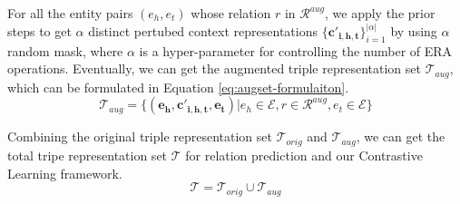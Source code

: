 \documentclass[11pt]{article}
\begin{document}
    For all the entity pairs $(e_h,e_t)$ whose relation $r$ in $\mathcal{R}^{aug}$, we apply the prior steps to get $\alpha$ distinct pertubed context representations $\{\mathbf{c'_{i,h,t}}\}^{|\alpha|}_{i=1}$ by using $\alpha$ random mask, where $\alpha$ is a hyper-parameter for controlling the number of ERA operations. Eventually, we can get the augmented triple representation set $\mathcal{T}_{aug}$, which can be formulated in Equation \ref{eq:augset-formulaiton}.
    \begin{equation}
        \label{eq:augset-formulaiton}
        \mathcal{T}_{aug} = \{\mathbf{(e_h,c'_{i,h,t},e_t)} | e_h \in \mathcal{E}, r \in \mathcal{R}^{aug}, e_t \in \mathcal{E}\}
    \end{equation}
    
    Combining the original triple representation set $\mathcal{T}_{orig}$ and $\mathcal{T}_{aug}$, we can get the total tripe representation set $\mathcal{T}$ for relation prediction and our Contrastive Learning framework.
    \begin{equation}
        \mathcal{T} = \mathcal{T}_{orig} \cup \mathcal{T}_{aug}
    \end{equation}
    
\end{document}
